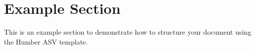 %
%
%
%

\section{Example Section}
This is an example section to demonstrate how to structure your document using the Humber ASV template.
